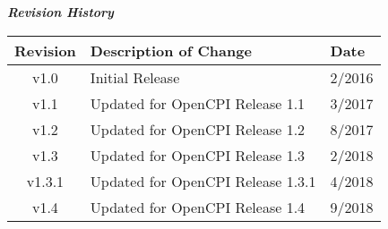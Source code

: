 \maketitle
\thispagestyle{fancy}
\newpage

	\begin{center}
	\textit{\textbf{Revision History}}
		\begin{table}[H] %
		\label{table:revisions}
		\centering
			\begin{tabularx}{.7\textwidth}{|c|X|l|}
			\hline
			\rowcolor{blue}
			\textbf{Revision} & \textbf{Description of Change} & \textbf{Date} \\
		    \hline
			v1.0 & Initial Release & 2/2016 \\
		    \hline
			v1.1 & Updated for OpenCPI Release 1.1 & 3/2017 \\
			\hline
			v1.2 & Updated for OpenCPI Release 1.2 & 8/2017 \\
			\hline
			v1.3 & Updated for OpenCPI Release 1.3 & 2/2018 \\
			\hline
			v1.3.1 & Updated for OpenCPI Release 1.3.1 & 4/2018 \\
			\hline
			v1.4 & Updated for OpenCPI Release 1.4 & 9/2018 \\
			\hline
			\end{tabularx}
		\end{table}
	\end{center}

\newpage

\tableofcontents



\listoftables

\newpage

